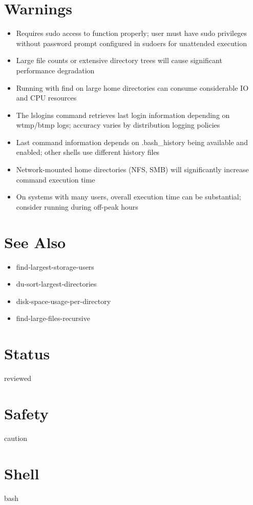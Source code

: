 \documentclass[openany]{book}
\begin{document}
\section*{Warnings}
\begin{itemize}
  \item Requires sudo access to function properly; user must have sudo privileges without password prompt configured in sudoers for unattended execution
  \item Large file counts or extensive directory trees will cause significant performance degradation
  \item Running with find on large home directories can consume considerable IO and CPU resources
  \item The lslogins command retrieves last login information depending on wtmp/btmp logs; accuracy varies by distribution logging policies
  \item Last command information depends on .bash\_history being available and enabled; other shells use different history files
  \item Network-mounted home directories (NFS, SMB) will significantly increase command execution time
  \item On systems with many users, overall execution time can be substantial; consider running during off-peak hours
\end{itemize}

\section*{See Also}
\begin{itemize}
  \item find-largest-storage-users
  \item du-sort-largest-directories
  \item disk-space-usage-per-directory
  \item find-large-files-recursive
\end{itemize}

\section*{Status}
reviewed

\section*{Safety}
caution

\section*{Shell}
bash
\end{document}
